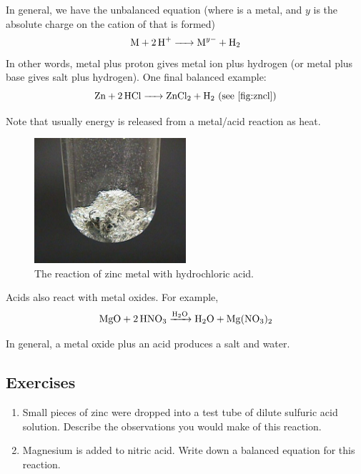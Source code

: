 \documentclass[a4paper]{memoir}
\begin{document}
In general, we have the unbalanced equation (where  is a metal, and $ y $ is the absolute charge on the cation of  that is formed)
\begin{equation}
  \ce{M + 2H+ -> M^y- + H2}
\end{equation}
In other words, metal plus proton gives metal ion plus hydrogen (or metal plus base gives salt plus hydrogen). One final balanced example:
\begin{equation}
  \ce{Zn + 2HCl -> ZnCl2 + H2} \text{ (see \cref{fig:zncl})}
\end{equation}

Note that usually energy is released from a metal/acid reaction as heat.

\begin{figure}
  \centering
  \includegraphics[width=0.5\textwidth]{zncl}
  \caption{The reaction of zinc metal with hydrochloric acid.\label{fig:zncl}}
\end{figure}

Acids also react with metal oxides. For example,
\begin{equation}
  \ce{MgO + 2HNO3 ->[H2O] H2O + Mg(NO3)2}
\end{equation}

In general, a metal oxide plus an acid produces a salt and water.

\subsection*{Exercises}
\begin{enumerate}
  \item Small pieces of zinc were dropped into a test tube of dilute sulfuric acid solution. Describe the observations you would make of this reaction.
  \item Magnesium is added to nitric acid. Write down a balanced equation for this reaction.
\end{enumerate}
\end{document}
